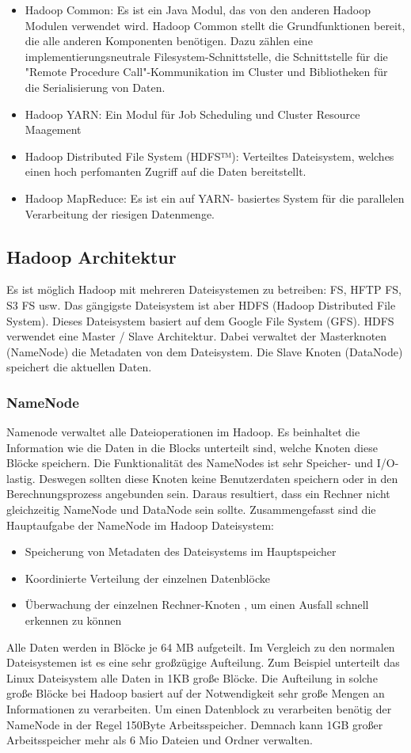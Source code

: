 \begin{itemize}
\item Hadoop Common: Es ist ein Java Modul, das von den anderen Hadoop Modulen verwendet wird. Hadoop Common stellt die Grundfunktionen bereit, die alle anderen Komponenten benötigen. Dazu zählen eine implementierungsneutrale Filesystem-Schnittstelle, die Schnittstelle für die "Remote Procedure Call"-Kommunikation im Cluster und Bibliotheken für die Serialisierung von Daten.
\item Hadoop YARN: Ein Modul für Job Scheduling und Cluster Resource Maagement
\item Hadoop Distributed File System (HDFS™): Verteiltes Dateisystem, welches einen hoch perfomanten Zugriff auf die Daten bereitstellt.
\item Hadoop MapReduce: Es ist ein auf YARN- basiertes System für die parallelen Verarbeitung der riesigen Datenmenge.
\end{itemize}
\subsection{Hadoop Architektur}
Es ist möglich Hadoop mit mehreren Dateisystemen zu betreiben: FS, HFTP FS, S3 FS usw. Das gängigste Dateisystem ist aber HDFS (Hadoop Distributed File System). Dieses Dateisystem basiert auf dem Google File System (GFS). 
HDFS verwendet eine Master / Slave Architektur. Dabei verwaltet der Masterknoten (NameNode) die Metadaten von dem Dateisystem. Die Slave Knoten (DataNode) speichert die aktuellen Daten.
\subsubsection{NameNode}
Namenode verwaltet alle Dateioperationen im Hadoop. Es beinhaltet die Information wie die Daten in die Blocks unterteilt sind, welche Knoten diese Blöcke speichern.
Die Funktionalität des NameNodes ist sehr Speicher- und I/O-lastig. Deswegen sollten diese Knoten keine Benutzerdaten speichern oder in den Berechnungsprozess angebunden sein. Daraus resultiert, dass ein Rechner nicht gleichzeitig NameNode und DataNode sein sollte.
Zusammengefasst sind die Hauptaufgabe der NameNode im Hadoop Dateisystem:
\begin{itemize}
\item Speicherung von Metadaten des Dateisystems im Hauptspeicher
\item Koordinierte Verteilung der einzelnen Datenblöcke
\item Überwachung der einzelnen Rechner-Knoten , um einen Ausfall schnell erkennen zu können 
\end{itemize}
\cite[S. XX]{Wartal2012}
Alle Daten werden in Blöcke je 64 MB aufgeteilt. Im Vergleich zu den normalen Dateisystemen ist es eine sehr großzügige Aufteilung. Zum Beispiel unterteilt das Linux Dateisystem alle Daten in 1KB große Blöcke. Die Aufteilung in solche große Blöcke bei Hadoop basiert auf der Notwendigkeit sehr große Mengen an Informationen zu verarbeiten. Um einen Datenblock zu verarbeiten benötig der NameNode in der Regel 150Byte Arbeitsspeicher. Demnach kann 1GB großer Arbeitsspeicher mehr als 6 Mio Dateien und Ordner verwalten. \cite[S. XX]{Wartal2012}
